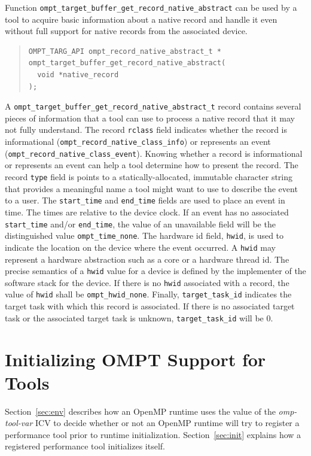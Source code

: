 \documentclass{article}
\begin{document}
Function  \verb|ompt_target_buffer_get_record_native_abstract| can be used by a tool to acquire basic information about a native record and handle it even without full support for  native records from the associated device.
\begin{quote}
\begin{verbatim}
OMPT_TARG_API ompt_record_native_abstract_t *
ompt_target_buffer_get_record_native_abstract(
  void *native_record 
);

\end{verbatim}
\end{quote}
A  \verb|ompt_target_buffer_get_record_native_abstract_t| record contains several pieces of information that a tool can use to process a native record that it may not fully understand. The record \verb|rclass| field indicates whether the record is informational (\verb|ompt_record_native_class_info|) or represents an event (\verb|ompt_record_native_class_event|). Knowing whether a record is informational or represents an event can help a tool determine how to present the record. The record  \verb|type| field is points to a statically-allocated, immutable character string that provides  a meaningful name  a tool might want to use to describe the event to a user. The \verb|start_time| and \verb|end_time| fields are used to place an event in time. The times are relative to the device clock. If an event has no associated \verb|start_time| and/or \verb|end_time|, the value of an unavailable field will be the distinguished value \verb|ompt_time_none|. The hardware id field, \verb|hwid|,  is used to indicate the location on the device where the event occurred. A \verb|hwid| may represent a hardware abstraction such as a core or a hardware thread id. The precise semantics of a \verb|hwid| value for a device is defined by the implementer of the software stack for the device. If there is no \verb|hwid| associated with a record, the value of \verb|hwid| shall be \verb|ompt_hwid_none|. Finally, \verb|target_task_id| indicates the target task with which this record is associated. If there is no associated target task or the associated target task is unknown,  \verb|target_task_id|  will be  0.

\section{Initializing OMPT Support for Tools}
\label{sec:enabling}

Section~\ref{sec:env} describes how an OpenMP runtime uses the value of the {\em omp-tool-var} ICV to decide whether or not an OpenMP runtime will try to register a performance tool prior to runtime initialization.
Section~\ref{sec:init} explains how a registered performance tool initializes itself.
\end{document}

